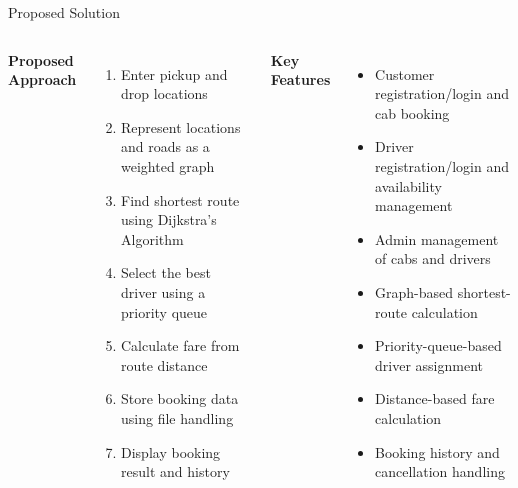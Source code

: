 \documentclass[aspectratio=169,11pt]{beamer}
\begin{document}
\begin{frame}{Proposed Solution}

\small

\vspace{-4mm}

\begin{columns}[T,totalwidth=\textwidth]


\textbf{\color{GEUBlue}Proposed Approach}
\begin{enumerate}\itemsep1pt
\item Enter pickup and drop locations
\item Represent locations and roads as a weighted graph
\item Find shortest route using Dijkstra's Algorithm
\item Select the best driver using a priority queue
\item Calculate fare from route distance
\item Store booking data using file handling
\item Display booking result and history
\end{enumerate}


\textbf{\color{GEUBlue}Key Features}
\begin{itemize}\itemsep1.5pt
\item Customer registration/login and cab booking
\item Driver registration/login and availability management
\item Admin management of cabs and drivers
\item Graph-based shortest-route calculation
\item Priority-queue-based driver assignment
\item Distance-based fare calculation
\item Booking history and cancellation handling
\end{itemize}

\end{columns}

\vspace{1mm}


\end{frame}
\end{document}
